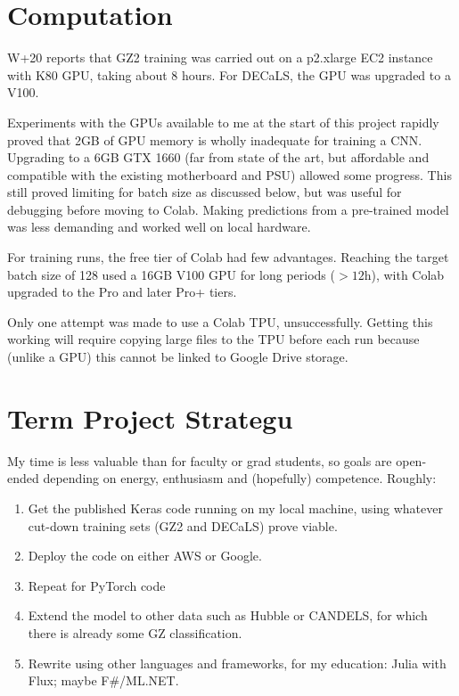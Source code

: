 \documentclass[preprint]{aastex631}
\begin{document}
\section{Computation} \label{sec:comp}

W+20 reports that GZ2 training was carried out on a p2.xlarge EC2 instance with K80 GPU, taking about 8 hours. For DECaLS, the GPU was upgraded to a V100.

Experiments with the GPUs available to me at the start of this project rapidly proved that 2GB of GPU memory is wholly inadequate for training a CNN. Upgrading to a 6GB GTX 1660 (far from state of the art, but affordable and compatible with the existing motherboard and PSU) allowed some progress. This still proved limiting for batch size as discussed below, but was useful for debugging before moving to Colab. Making predictions from a pre-trained model was less demanding and worked well on local hardware.

For training runs, the free tier of Colab had few advantages. Reaching the target batch size of 128 used a 16GB V100 GPU for long periods ($>12$h), with Colab upgraded to the Pro and later Pro+ tiers.

Only one attempt was made to use a Colab TPU, unsuccessfully. Getting this working will require copying large files to the TPU before each run because (unlike a GPU) this cannot be linked to Google Drive storage.


\section{Term Project Strategu} \label{sec:goals}

My time is less valuable than for faculty or grad students, so goals are open-ended depending on energy, enthusiasm and (hopefully) competence. Roughly:
\begin{enumerate}
	\item Get the published Keras code running on my local machine, using whatever cut-down training sets (GZ2 and DECaLS) prove viable.
	\item Deploy the code on either AWS or Google.
	\item Repeat for PyTorch code
	\item Extend the model to other data such as Hubble or CANDELS, for which there is already some GZ classification.
	\item Rewrite using other languages and frameworks, for my education: Julia with Flux; maybe F\#/ML.NET.
\end{enumerate}
\end{document}
